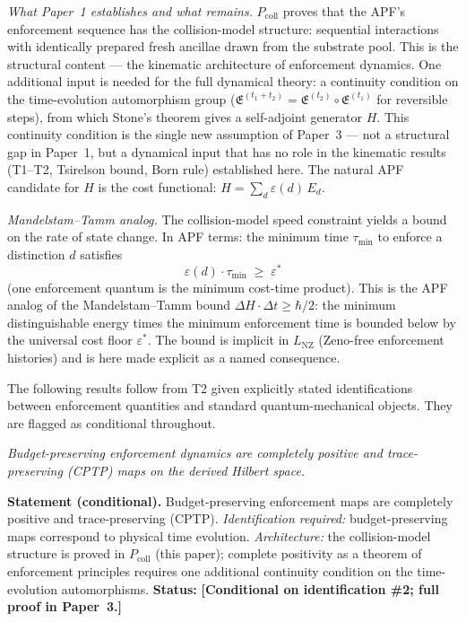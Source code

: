 \documentclass[11pt]{article}
\theoremstyle{remark}
\begin{document}
\begin{tcolorbox}[apfbox, title={$P_{\mathrm{coll}}$: Enforcement Steps as a Collision Model}]
\smallskip\noindent\textit{What Paper~1 establishes and what remains.}  $P_{\mathrm{coll}}$ proves that the APF's enforcement sequence has the collision-model structure: sequential interactions with identically prepared fresh ancillae drawn from the substrate pool.  This is the structural content --- the kinematic architecture of enforcement dynamics.  One additional input is needed for the full dynamical theory: a continuity condition on the time-evolution automorphism group ($\mathfrak{E}^{(t_1+t_2)} = \mathfrak{E}^{(t_2)} \circ \mathfrak{E}^{(t_1)}$ for reversible steps), from which Stone's theorem gives a self-adjoint generator $H$.  This continuity condition is the single new assumption of Paper~3 --- not a structural gap in Paper~1, but a dynamical input that has no role in the kinematic results (T1--T2, Tsirelson bound, Born rule) established here.  The natural APF candidate for $H$ is the cost functional: $H = \sum_d \varepsilon(d)\, E_d$.

\smallskip\noindent\textit{Mandelstam--Tamm analog.}  The collision-model speed constraint yields a bound on the rate of state change.  In APF terms: the minimum time $\tau_{\min}$ to enforce a distinction $d$ satisfies
\[
  \varepsilon(d) \cdot \tau_{\min} \;\ge\; \varepsilon^*
\]
(one enforcement quantum is the minimum cost-time product).  This is the APF analog of the Mandelstam--Tamm bound $\Delta H \cdot \Delta t \ge \hbar/2$: the minimum distinguishable energy times the minimum enforcement time is bounded below by the universal cost floor $\varepsilon^*$.  The bound is implicit in $L_{\mathrm{NZ}}$ (Zeno-free enforcement histories) and is here made explicit as a named consequence.
\end{tcolorbox}

The following results follow from T2 given explicitly stated identifications between enforcement quantities and standard quantum-mechanical objects.  They are flagged as conditional throughout.

\begin{tcolorbox}[apfbox, title={$T_{\mathrm{CPTP}}$: Admissible Dynamics}]
\textit{Budget-preserving enforcement dynamics are completely positive and trace-preserving (CPTP) maps on the derived Hilbert space.}

\smallskip\noindent\textbf{Statement (conditional).}  Budget-preserving enforcement maps are completely positive and trace-preserving (CPTP).  \textit{Identification required:} budget-preserving maps correspond to physical time evolution.  \textit{Architecture:} the collision-model structure is proved in $P_{\mathrm{coll}}$ (this paper); complete positivity as a theorem of enforcement principles requires one additional continuity condition on the time-evolution automorphisms.  \textbf{Status:} \textbf{[Conditional on identification \#2; full proof in Paper~3.]}
\end{tcolorbox}
\end{document}
